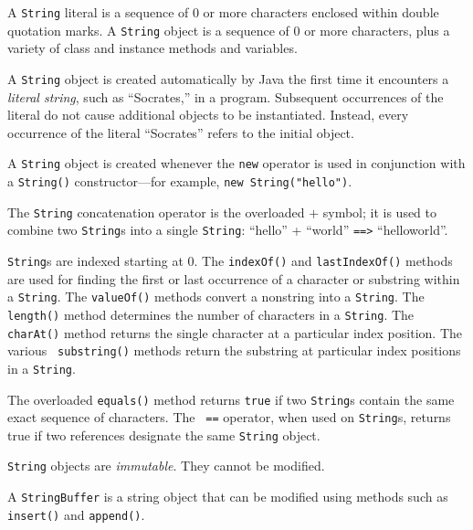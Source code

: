 \pagebreak
{}
\begin{SMBL}
\item  A {\tt String} literal is a sequence of 0 or more characters
enclosed within double quotation marks.   A {\tt String} object is a
sequence of 0 or more characters, plus a variety of class and instance
methods and variables.

\item A {\tt String} object is created automatically by Java the first
time it encounters a {\it literal string}, such as ``Socrates,'' in a
program.  Subsequent occurrences of the literal do not cause
additional objects to be instantiated.  Instead, every occurrence of
the literal ``Socrates'' refers to the initial object.

\item A {\tt String} object is created whenever the {\tt new}
operator is used in conjunction with a {\tt String()}
constructor---for example, {\tt new String("hello")}.

\item  The {\tt String} concatenation operator is the overloaded
$+$ symbol; it is used to combine two {\tt String}s into a single
{\tt String}: ``hello'' + ``world'' \verb|==>| ``helloworld''.

\item {\tt String}s are indexed starting at 0.  The {\tt indexOf()}
and {\tt last\-Index\-Of()} methods are used for
finding the first or last occurrence of a character or substring
within a {\tt String}. The {\tt valueOf()} methods convert a nonstring
into a {\tt String}. The {\tt length()} method determines the number
of characters in a {\tt String}.  The {\tt charAt()} method returns
the single character at a particular index position.  The various {\tt
substring()} methods return the substring at particular index
positions in a {\tt String}.

\item The overloaded {\tt equals()} method returns {\tt true} if two
{\tt String}s contain the same exact sequence of characters.  The {\tt
==} operator, when used on {\tt String}s, returns true if two
references designate the same {\tt String} object.

\item {\tt String} objects are {\it immutable}. They cannot be 
modified.

\item  A {\tt StringBuffer} is a string object that can be 
modified using methods such as {\tt insert()} and {\tt append()}.


\end{SMBL}

